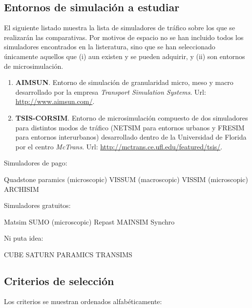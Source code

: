 \subsection{Entornos de simulación a estudiar}



El siguiente listado muestra la lista de simuladores de tráfico sobre los que se realizarán las comparativas. Por motivos de espacio no se han incluido todos los simuladores encontrados en la listeratura, sino que se han seleccionado únicamente aquellos que (i) aun existen y se pueden adquirir, y (ii) son entornos de microsimulación.

\begin{enumerate}
	\item \textbf{AIMSUN}. Entorno de simulación de granularidad micro, meso y macro desarrollado por la empresa \textit{Transport Simulation Systems}. Url: \url{http://www.aimsun.com/}.
	\item \textbf{TSIS-CORSIM}. Entorno de microsimulación compuesto de dos simuladores para distintos modos de tráfico (NETSIM para entornos urbanos y FRESIM para entornos interurbanos) desarrollado dentro de la Universidad de Florida por el centro \textit{McTrans}. Url: \url{http://mctrans.ce.ufl.edu/featured/tsis/}.
\end{enumerate}

Simuladores de pago:

Quadstone paramics (microscopic)
VISSUM (macroscopic)
VISSIM (microscopic)
ARCHISIM

Simuladores gratuitos:

Matsim
SUMO (microscopic)
Repast
MAINSIM
Synchro

Ni puta idea:

CUBE
SATURN
PARAMICS
TRANSIMS


\subsection{Criterios de selección}

Los criterios se muestran ordenados alfabéticamente:

